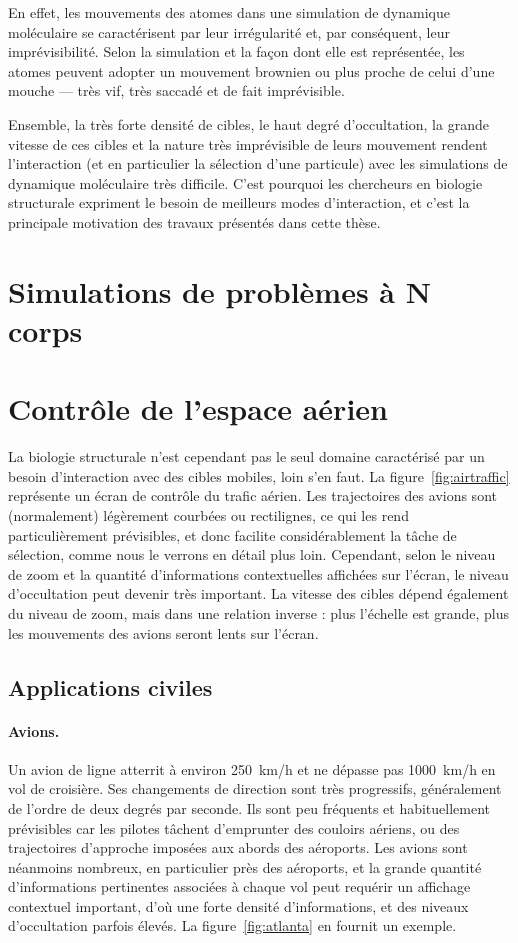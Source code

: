 	En effet, les mouvements des atomes dans une simulation de dynamique moléculaire se caractérisent par leur irrégularité et, par conséquent, leur imprévisibilité. Selon la simulation et la façon dont elle est représentée, les atomes peuvent adopter un mouvement brownien ou plus proche de celui d'une mouche --- très vif, très saccadé et de fait imprévisible.
	
	Ensemble, la très forte densité de cibles, le haut degré d'occultation, la grande vitesse de ces cibles et la nature très imprévisible de leurs mouvement rendent l'interaction (et en particulier la sélection d'une particule) avec les simulations de dynamique moléculaire très difficile. C'est pourquoi les chercheurs en biologie structurale expriment le besoin de meilleurs modes d'interaction, et c'est la principale motivation des travaux présentés dans cette thèse.
	
	\section{Simulations de problèmes à N corps}
	
	\section{Contrôle de l'espace aérien}
	La biologie structurale n'est cependant pas le seul domaine caractérisé par un besoin d'interaction avec des cibles mobiles, loin s'en faut. La figure~\ref{fig:airtraffic} représente un écran de contrôle du trafic aérien. Les trajectoires des avions sont (normalement) légèrement courbées ou rectilignes, ce qui les rend particulièrement prévisibles, et donc facilite considérablement la tâche de sélection, comme nous le verrons en détail plus loin. Cependant, selon le niveau de zoom et la quantité d'informations contextuelles affichées sur l'écran, le niveau d'occultation peut devenir très important. La vitesse des cibles dépend également du niveau de zoom, mais dans une relation inverse : plus l'échelle est grande, plus les mouvements des avions seront lents sur l'écran.
	
	\subsection{Applications civiles}
	\paragraph{Avions.}
	Un avion de ligne atterrit à environ 250~km/h et ne dépasse pas 1000~km/h en vol de croisière. Ses changements de direction sont très progressifs, généralement de l'ordre de deux degrés par seconde. Ils sont peu fréquents et habituellement prévisibles car les pilotes tâchent d'emprunter des couloirs aériens, ou des trajectoires d'approche imposées aux abords des aéroports. Les avions sont néanmoins nombreux, en particulier près des aéroports, et la grande quantité d'informations pertinentes associées à chaque vol peut requérir un affichage contextuel important, d'où une forte densité d'informations, et des niveaux d'occultation parfois élevés. La figure~\ref{fig:atlanta} en fournit un exemple.
	
